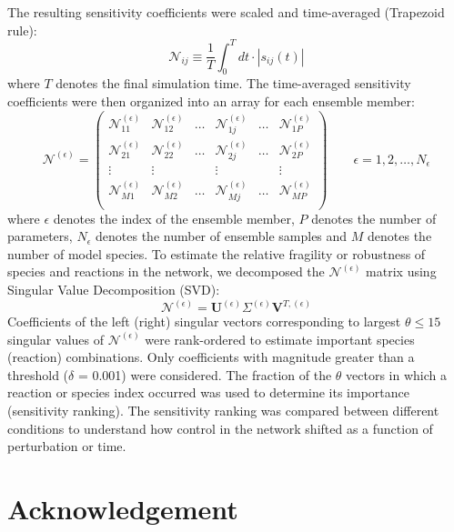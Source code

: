 \documentclass[12pt]{article}
\begin{document}
The resulting sensitivity coefficients were scaled and time-averaged (Trapezoid rule):
\begin{equation}\label{eqn_INsen}
	\mathcal{N}_{ij} \equiv \frac{1}{T}\int^{T}_{0} dt \cdot |s_{ij}(t)|
\end{equation}
where $T$ denotes the final simulation time.
The time-averaged sensitivity coefficients were then organized into an array for each ensemble member:
\begin{equation}
	\mathcal{N}^{\left(\epsilon\right)} = 
	\begin{pmatrix}
		\mathcal{N}_{11}^{\left(\epsilon\right)} & \mathcal{N}_{12}^{\left(\epsilon\right)} & \hdots & \mathcal{N}_{1j}^{\left(\epsilon\right)} & \hdots & \mathcal{N}_{1P}^{\left(\epsilon\right)} \\
		\mathcal{N}_{21}^{\left(\epsilon\right)} & \mathcal{N}_{22}^{\left(\epsilon\right)} & \hdots & \mathcal{N}_{2j}^{\left(\epsilon\right)} & \hdots & \mathcal{N}_{2P}^{\left(\epsilon\right)} \\
		\vdots & \vdots & & \vdots & & \vdots \\
		\mathcal{N}_{M1}^{\left(\epsilon\right)} & \mathcal{N}_{M2}^{\left(\epsilon\right)} & \hdots & \mathcal{N}_{Mj}^{\left(\epsilon\right)} & \hdots & \mathcal{N}_{MP}^{\left(\epsilon\right)} \\
	\end{pmatrix}\qquad\epsilon = 1,2,\hdots,N_{\epsilon}
\end{equation}
where $\epsilon$ denotes the index of the ensemble member, $P$ denotes the number of parameters, 
$N_{\epsilon}$ denotes the number of ensemble samples and $M$ denotes the number of model species.
To estimate the relative fragility or robustness of species and reactions in the network, we decomposed the $\mathcal{N}^{\left(\epsilon\right)}$ matrix 
using Singular Value Decomposition (SVD):
\begin{equation}
	\mathcal{N}^{\left(\epsilon\right)} = \mathbf{U}^{\left(\epsilon\right)}\Sigma^{\left(\epsilon\right)}\mathbf{V}^{T,{\left(\epsilon\right)}}
\end{equation}
Coefficients of the left (right) singular vectors corresponding to largest $\theta\leq{15}$ singular values of $\mathcal{N}^{\left(\epsilon\right)}$ 
were rank-ordered to estimate important species (reaction) combinations. Only coefficients with magnitude greater than a threshold ($\delta$ = 0.001) were considered. 
The fraction of the $\theta$ vectors in which a reaction or species index occurred was used to determine its importance (sensitivity ranking). 
The sensitivity ranking was compared between different conditions to understand how control in the network shifted as a function of perturbation or time.

\section*{Acknowledgement}




\end{document}
